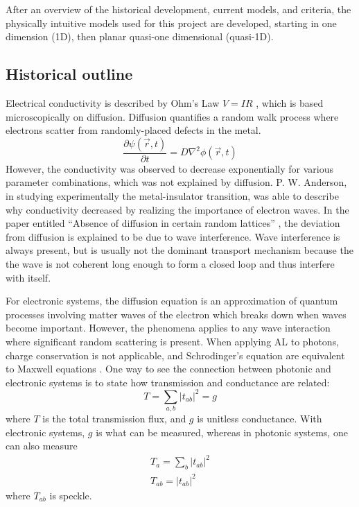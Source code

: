After an overview of the historical development, current models, and criteria, the physically intuitive models used for this project are developed, starting in one dimension (1D), then planar quasi-one dimensional (quasi-1D). %

\subsection{Historical outline}
Electrical conductivity is described by Ohm's Law $V = I R$ \cite{1917_Millikan}, which is based microscopically on diffusion. Diffusion quantifies a random walk process where electrons scatter from randomly-placed defects in the metal. 
\begin{equation}
 \frac{\partial \psi(\vec{r},t)}{\partial t} = D \nabla^2 \phi(\vec{r},t)
\end{equation}
However, the conductivity was observed to decrease exponentially for various parameter combinations, which was not explained by diffusion. P. W. Anderson, in studying experimentally the metal-insulator transition, was able to describe why conductivity decreased by realizing the importance of electron waves. In the paper entitled ``Absence of diffusion in certain random lattices'' \cite{1958_Anderson}, the deviation from diffusion is explained to be due to wave interference. Wave interference is always present, but is usually not the dominant transport mechanism because the the wave is not coherent long enough to form a closed loop and thus interfere with itself.

For electronic systems, the diffusion equation is an approximation of quantum processes involving matter waves of the electron which breaks down when waves become important. However, the phenomena applies to any wave interaction %
 where significant random scattering is present. When applying AL to photons, charge conservation is not applicable, and Schrodinger's equation are equivalent to Maxwell equations \cite{1998_POAN}. One way to see the connection between photonic and electronic systems is to state how transmission and conductance are related:
\begin{equation}
 T = \sum_{a,b} |t_{ab}|^2 = g
\end{equation}
where $T$ is the total transmission flux, and $g$ is unitless conductance. With electronic systems, $g$ is what can be measured, whereas in photonic systems, one can also measure
\begin{equation}
\begin{gathered}
 T_a = \sum_b |t_{ab}|^2 \\
 T_{ab} = |t_{ab}|^2
\end{gathered}
\end{equation}
where $T_{ab}$ is speckle. 

